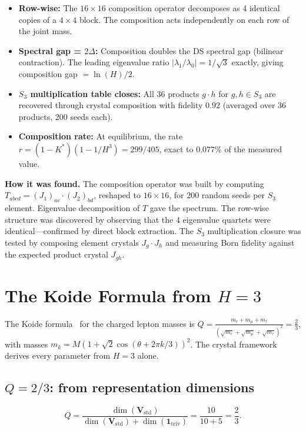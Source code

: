 \documentclass[11pt,a4paper]{article}
\theoremstyle{definition}
\theoremstyle{remark}
\begin{document}
\begin{itemize}[nosep]
\item \textbf{Row-wise:} The $16 \times 16$ composition operator decomposes as 4 identical copies of a $4 \times 4$ block. The composition acts independently on each row of the joint mass.
\item \textbf{Spectral gap = $2\Delta$:} Composition doubles the DS spectral gap (bilinear contraction). The leading eigenvalue ratio $|\lambda_1/\lambda_0| = 1/\sqrt{3}$ exactly, giving composition gap $= \ln(H)/2$.
\item \textbf{$S_3$ multiplication table closes:} All 36 products $g \cdot h$ for $g, h \in S_3$ are recovered through crystal composition with fidelity $0.92$ (averaged over 36 products, 200 seeds each).
\item \textbf{Composition rate:} At equilibrium, the rate $r = (1-K^*)(1-1/H^3) = 299/405$, exact to $0.077\%$ of the measured value.
\end{itemize}

\textbf{How it was found.} The composition operator was built by computing $T_{abcd} = (J_1)_{ac} \cdot (J_2)_{bd}$, reshaped to $16 \times 16$, for 200 random seeds per $S_3$ element. Eigenvalue decomposition of $T$ gave the spectrum. The row-wise structure was discovered by observing that the 4 eigenvalue quartets were identical---confirmed by direct block extraction. The $S_3$ multiplication closure was tested by composing element crystals $J_g \cdot J_h$ and measuring Born fidelity against the expected product crystal $J_{gh}$.


\section{The Koide Formula from $H=3$}\label{sec:koide}

The Koide formula~\cite{Koide1983} for the charged lepton masses is $Q = \frac{m_e + m_\mu + m_\tau}{(\sqrt{m_e} + \sqrt{m_\mu} + \sqrt{m_\tau})^2} = \frac{2}{3}$, with masses $m_k = M(1 + \sqrt{2}\cos(\theta + 2\pi k/3))^2$. The crystal framework derives every parameter from $H=3$ alone.

\subsection{$Q = 2/3$: from representation dimensions}

\begin{equation}
Q = \frac{\dim(\mathbf{V}_{\mathrm{std}})}{\dim(\mathbf{V}_{\mathrm{std}}) + \dim(\mathbf{1}_{\mathrm{triv}})} = \frac{10}{10 + 5} = \frac{2}{3}.
\end{equation}
\end{document}
